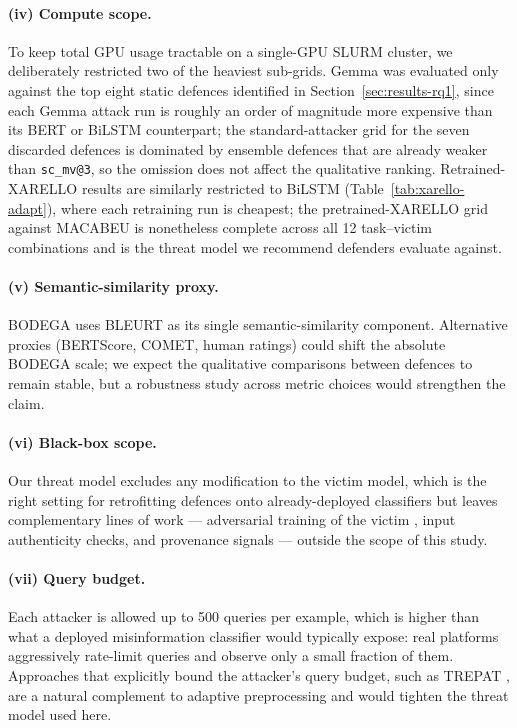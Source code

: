 \documentclass[11pt]{article}
\begin{document}
\paragraph{(iv) Compute scope.} To keep total GPU usage tractable on a single-GPU SLURM cluster, we deliberately restricted two of the heaviest sub-grids. Gemma was evaluated only against the top eight static defences identified in Section~\ref{sec:results-rq1}, since each Gemma attack run is roughly an order of magnitude more expensive than its BERT or BiLSTM counterpart; the standard-attacker grid for the seven discarded defences is dominated by ensemble defences that are already weaker than \texttt{sc\_mv@3}, so the omission does not affect the qualitative ranking. Retrained-XARELLO results are similarly restricted to BiLSTM (Table~\ref{tab:xarello-adapt}), where each retraining run is cheapest; the pretrained-XARELLO grid against MACABEU is nonetheless complete across all 12 task--victim combinations and is the threat model we recommend defenders evaluate against.

\paragraph{(v) Semantic-similarity proxy.} BODEGA uses BLEURT \citep{Sellam2020} as its single semantic-similarity component. Alternative proxies (BERTScore, COMET, human ratings) could shift the absolute BODEGA scale; we expect the qualitative comparisons between defences to remain stable, but a robustness study across metric choices would strengthen the claim.

\paragraph{(vi) Black-box scope.} Our threat model excludes any modification to the victim model, which is the right setting for retrofitting defences onto already-deployed classifiers but leaves complementary lines of work --- adversarial training of the victim \citep{Madry2018, Miyato2017advtrain}, input authenticity checks, and provenance signals --- outside the scope of this study.

\paragraph{(vii) Query budget.} Each attacker is allowed up to 500 queries per example, which is higher than what a deployed misinformation classifier would typically expose: real platforms aggressively rate-limit queries and observe only a small fraction of them. Approaches that explicitly bound the attacker's query budget, such as TREPAT \citep{Przybyla2025LLMattack}, are a natural complement to adaptive preprocessing and would tighten the threat model used here.
\end{document}
